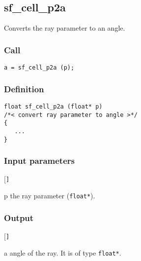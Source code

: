 \subsection{{sf\_cell\_p2a}}
Converts the ray parameter to an angle.


\subsubsection*{Call}
\begin{verbatim}a = sf_cell_p2a (p);\end{verbatim}


\subsubsection*{Definition}
\begin{verbatim}
float sf_cell_p2a (float* p)
/*< convert ray parameter to angle >*/
{
   ...
}
\end{verbatim}

\subsubsection*{Input parameters}
\begin{desclist}{\tt }{\quad}[\tt ]
   \setlength\itemsep{0pt}
   \item[p] the ray parameter (\texttt{float*}).  
\end{desclist}

\subsubsection*{Output}
\begin{desclist}{\tt }{\quad}[\tt ]
   \setlength\itemsep{0pt}  
   \item[a] angle of the ray. It is of type \texttt{float*}.
\end{desclist}


